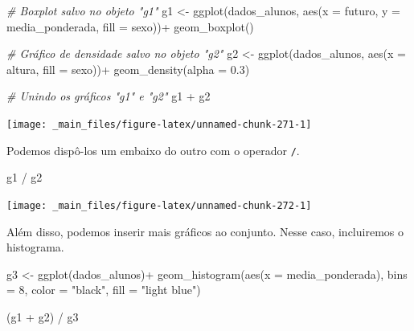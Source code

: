 \documentclass[
  brazilian,
]{book}
\newenvironment{Shaded}{\begin{snugshade}}{\end{snugshade}}
\newcommand{\AttributeTok}[1]{\textcolor[rgb]{0.77,0.63,0.00}{#1}}
\newcommand{\CommentTok}[1]{\textcolor[rgb]{0.56,0.35,0.01}{\textit{#1}}}
\newcommand{\DecValTok}[1]{\textcolor[rgb]{0.00,0.00,0.81}{#1}}
\newcommand{\FloatTok}[1]{\textcolor[rgb]{0.00,0.00,0.81}{#1}}
\newcommand{\FunctionTok}[1]{\textcolor[rgb]{0.00,0.00,0.00}{#1}}
\newcommand{\NormalTok}[1]{#1}
\newcommand{\OtherTok}[1]{\textcolor[rgb]{0.56,0.35,0.01}{#1}}
\newcommand{\SpecialCharTok}[1]{\textcolor[rgb]{0.00,0.00,0.00}{#1}}
\newcommand{\StringTok}[1]{\textcolor[rgb]{0.31,0.60,0.02}{#1}}
\begin{document}
\begin{Shaded}
\begin{Highlighting}[]
\CommentTok{\# Boxplot salvo no objeto "g1"}
\NormalTok{g1 }\OtherTok{\textless{}{-}} \FunctionTok{ggplot}\NormalTok{(dados\_alunos,}
             \FunctionTok{aes}\NormalTok{(}\AttributeTok{x =}\NormalTok{ futuro,}
                 \AttributeTok{y =}\NormalTok{ media\_ponderada,}
                 \AttributeTok{fill =}\NormalTok{ sexo))}\SpecialCharTok{+}
  \FunctionTok{geom\_boxplot}\NormalTok{()}

\CommentTok{\# Gráfico de densidade salvo no objeto "g2"}
\NormalTok{g2 }\OtherTok{\textless{}{-}} \FunctionTok{ggplot}\NormalTok{(dados\_alunos,}
             \FunctionTok{aes}\NormalTok{(}\AttributeTok{x =}\NormalTok{ altura,}
                 \AttributeTok{fill =}\NormalTok{ sexo))}\SpecialCharTok{+}
  \FunctionTok{geom\_density}\NormalTok{(}\AttributeTok{alpha =} \FloatTok{0.3}\NormalTok{)}

\CommentTok{\# Unindo os gráficos "g1" e "g2"}
\NormalTok{g1 }\SpecialCharTok{+}\NormalTok{ g2}
\end{Highlighting}
\end{Shaded}

\begin{center}\texttt{[image: \_main\_files/figure-latex/unnamed-chunk-271-1]} \end{center}

Podemos dispô-los um embaixo do outro com o operador \texttt{/}.

\begin{Shaded}
\begin{Highlighting}[]
\NormalTok{g1 }\SpecialCharTok{/}\NormalTok{ g2}
\end{Highlighting}
\end{Shaded}

\begin{center}\texttt{[image: \_main\_files/figure-latex/unnamed-chunk-272-1]} \end{center}

Além disso, podemos inserir mais gráficos ao conjunto. Nesse caso, incluiremos o histograma.

\begin{Shaded}
\begin{Highlighting}[]
\NormalTok{g3 }\OtherTok{\textless{}{-}} \FunctionTok{ggplot}\NormalTok{(dados\_alunos)}\SpecialCharTok{+}
  \FunctionTok{geom\_histogram}\NormalTok{(}\FunctionTok{aes}\NormalTok{(}\AttributeTok{x =}\NormalTok{ media\_ponderada),}
                 \AttributeTok{bins =} \DecValTok{8}\NormalTok{, }
                 \AttributeTok{color =} \StringTok{"black"}\NormalTok{,}
                 \AttributeTok{fill =} \StringTok{"light blue"}\NormalTok{)}

\NormalTok{(g1 }\SpecialCharTok{+}\NormalTok{ g2) }\SpecialCharTok{/}\NormalTok{ g3}
\end{Highlighting}
\end{Shaded}
\end{document}
